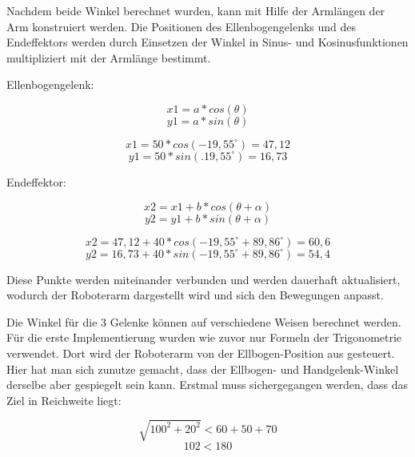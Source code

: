 \documentclass[12pt]{article}
\begin{document}
                    Nachdem beide Winkel berechnet wurden, kann mit Hilfe der Armlängen der Arm konstruiert werden.
                    Die Positionen des Ellenbogengelenks und des Endeffektors werden durch Einsetzen der Winkel in
                    Sinus- und Kosinusfunktionen multipliziert mit der Armlänge bestimmt.

                    Ellenbogengelenk:

                    \[
                        x1 = a * cos(\theta)
                    \]
                    \[
                        y1 = a * sin(\theta)
                    \]

                    \[
                        x1 = 50 * cos(-19,55^\circ) = 47,12
                    \]
                    \[
                        y1 = 50 * sin(.19,55^\circ) = 16,73
                    \]

                    Endeffektor:

                    \[
                        x2 = x1 + b * cos(\theta + \alpha)
                    \]
                    \[
                        y2 = y1 + b * sin(\theta + \alpha)
                    \]

                    \[
                        x2 = 47,12 + 40 * cos(-19,55^\circ + 89,86^\circ) = 60,6
                    \]
                    \[
                        y2 = 16,73 + 40 * sin(-19,55^\circ + 89,86^\circ) = 54,4
                    \]

                    Diese Punkte werden miteinander verbunden und werden dauerhaft aktualisiert, wodurch der
                    Roboterarm dargestellt wird und sich den Bewegungen anpasst.

                    Die Winkel für die 3 Gelenke können auf verschiedene Weisen berechnet werden. Für die erste
                    Implementierung wurden wie zuvor nur Formeln der Trigonometrie verwendet. Dort wird der
                    Roboterarm von der Ellbogen-Position aus gesteuert. Hier hat man sich zunutze gemacht, dass
                    der Ellbogen- und Handgelenk-Winkel derselbe aber gespiegelt sein kann.
                    Erstmal muss sichergegangen werden, dass das Ziel in Reichweite liegt:

                    \[
                        \sqrt{100^2 + 20^2} < 60 + 50 +70
                    \]
                    \[
                        102 < 180
                    \]
\end{document}
